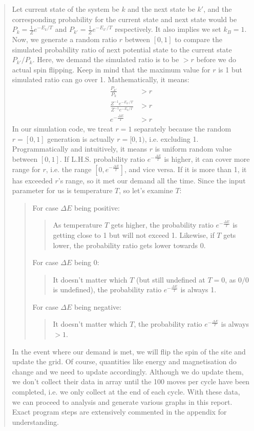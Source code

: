 \documentclass[a4paper]{article}
\numberwithin{equation}{section}
\begin{document}
\begin{quote}
Let current state of the system be $k$ and the next state be $k'$, and the corresponding probability for the current state and next state would be $P_{k}=\frac{1}{Z}e^{-E_{k}/T}$ and $P_{k'}=\frac{1}{Z}e^{-E_{k'}/T}$ respectively. It also implies we set $k_B=1$. Now, we generate a random ratio $r$ between $[0,1]$ to compare the simulated probability ratio of next potential state to the current state $P_{k'}/P_{k}$. Here, we demand the simulated ratio is to be $> r$ before we do actual spin flipping. Keep in mind that the maximum value for $r$ is 1 but simulated ratio can go over 1. Mathematically, it means:
\begin{align}
\frac{P_{k'}}{P_{k}}&>r\\
\frac{Z^{-1}e^{-E_{k'}/T}}{Z^{-1}e^{-E_{k}/T}}&>r\\
e^{-\frac{\Delta E}{T}}&>r\label{eq:prob}
\end{align}
In our simulation code, we treat $r=1$ separately because the random $r=[0,1]$ generation is actually $r=[0,1)$, i.e. excluding 1. Programmatically and intuitively, it means $r$ is uniform random value between $[0,1]$. If L.H.S. probability ratio $e^{-\frac{\Delta E}{T}}$ is higher, it can cover more range for $r$, i.e. the range $[0,e^{-\frac{\Delta E}{T}}]$, and vice versa. If it is more than 1, it has exceeded $r$'s range, so it met our demand all the time. Since the input parameter for us is temperature $T$, so let's examine $T$:

\begin{quote}
For case $\Delta E$ being positive:

\begin{quote}
	As temperature $T$ gets higher, the probability ratio $e^{-\frac{\Delta E}{T}}$ is getting close to 1 but will not exceed 1. Likewise, if $T$ gets lower, the probability ratio gets lower towards 0.
\end{quote}

For case $\Delta E$ being 0:
\begin{quote}
	It doesn't matter which $T$ (but still undefined at $T=0$, as $0/0$ is undefined), the probability ratio $e^{-\frac{\Delta E}{T}}$ is always 1.
\end{quote}

For case $\Delta E$ being negative:
\begin{quote}
It doesn't matter which $T$, the probability ratio $e^{-\frac{\Delta E}{T}}$ is always $>1$.
\end{quote}

\end{quote}

In the event where our demand is met, we will flip the spin of the site and update the grid. Of course, quantities like energy and magnetisation do change and we need to update accordingly. Although we do update them, we don't collect their data in array until the 100 moves per cycle have been completed, i.e. we only collect at the end of each cycle. With these data, we can proceed to analysis and generate various graphs in this report. Exact program steps are extensively commented in the appendix for understanding.
\end{quote}
\end{document}
